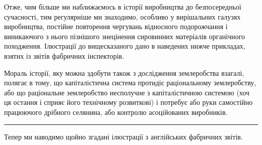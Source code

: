 Отже, чим більше ми наближаємось в історії виробництва
до безпосередньої сучасності, тим регулярніше ми знаходимо,
особливо у вирішальних галузях виробництва, постійне повторення
чергувань відносного подорожчання і виникаючого з нього
пізнішого знецінення сировинних матеріалів органічного походження.
Ілюстрації до вищесказаного дано в наведених нижче
прикладах, взятих із звітів фабричних інспекторів.

Мораль історії, яку можна здобути також з дослідження землеробства
взагалі, полягає в тому, що капіталістична система
протидіє раціональному землеробству, або що раціональне землеробство
несполучне з капіталістичною системою (хоч ця остання
і сприяє його технічному розвиткові) і потребує або руки самостійно
працюючого дрібного селянина, або контролю асоційованих
виробників.

\pfbreak

Тепер ми наводимо щойно згадані ілюстрації з англійських
фабричних звітів.

